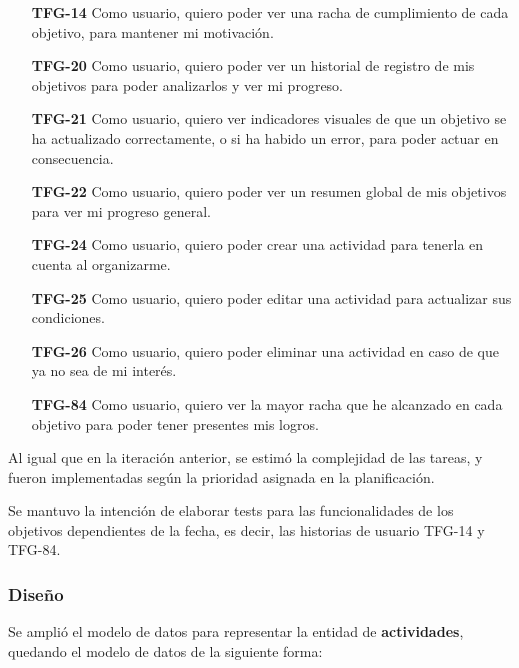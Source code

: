 \documentclass[10pt, a4paper]{aqademic}
\begin{document}
\begin{itemize}[leftmargin=16mm]
	\item [\textbf{TFG-14}] Como usuario, quiero poder ver una racha de cumplimiento de cada objetivo, para mantener mi motivación.
	
	\item [\textbf{TFG-20}] Como usuario, quiero poder ver un historial de registro de mis objetivos para poder analizarlos y ver mi progreso.
	
	\item [\textbf{TFG-21}] Como usuario, quiero ver indicadores visuales de que un objetivo se ha actualizado correctamente, o si ha habido un error, para poder actuar en consecuencia.
	
	\item [\textbf{TFG-22}] Como usuario, quiero poder ver un resumen global de mis objetivos para ver mi progreso general.
	
	\item [\textbf{TFG-24}] Como usuario, quiero poder crear una actividad para tenerla en cuenta al organizarme.
	
	\item [\textbf{TFG-25}] Como usuario, quiero poder editar una actividad para actualizar sus condiciones.
	
	\item [\textbf{TFG-26}] Como usuario, quiero poder eliminar una actividad en caso de que ya no sea de mi interés.
	
	\item [\textbf{TFG-84}] Como usuario, quiero ver la mayor racha que he alcanzado en cada objetivo para poder tener presentes mis logros.
\end{itemize}

Al igual que en la iteración anterior, se estimó la complejidad de las tareas, y fueron implementadas según la prioridad asignada en la planificación.

Se mantuvo la intención de elaborar tests para las funcionalidades de los objetivos dependientes de la fecha, es decir, las historias de usuario TFG-14 y TFG-84.

\subsubsection{Diseño}

Se amplió el modelo de datos para representar la entidad de \textbf{actividades}, quedando el modelo de datos de la siguiente forma:
\end{document}
